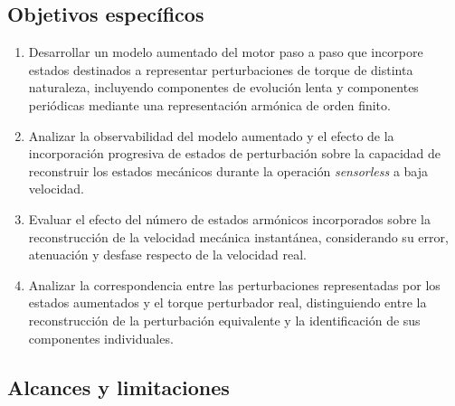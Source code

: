 \subsection{Objetivos específicos}

%
%
%
%
%
%
%
%

\begin{enumerate}
    \item Desarrollar un modelo aumentado del motor paso a paso que incorpore estados destinados a representar perturbaciones de torque de distinta naturaleza, incluyendo componentes de evolución lenta y componentes periódicas mediante una representación armónica de orden finito.
    \item Analizar la observabilidad del modelo aumentado y el efecto de la incorporación progresiva de estados de perturbación sobre la capacidad de reconstruir los estados mecánicos durante la operación \textit{sensorless} a baja velocidad.
    \item Evaluar el efecto del número de estados armónicos incorporados sobre la reconstrucción de la velocidad mecánica instantánea, considerando su error, atenuación y desfase respecto de la velocidad real.
    \item Analizar la correspondencia entre las perturbaciones representadas por los estados aumentados y el torque perturbador real, distinguiendo entre la reconstrucción de la perturbación equivalente y la identificación de sus componentes individuales.
\end{enumerate}


\subsection{Alcances y limitaciones}

